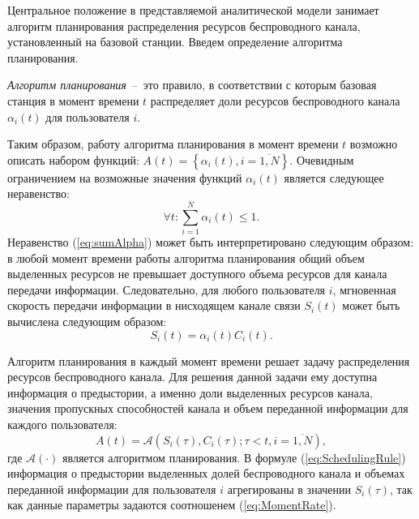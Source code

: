 Центральное положение в представляемой аналитической модели занимает алгоритм планирования распределения ресурсов беспроводного канала, установленный на базовой станции. Введем определение алгоритма планирования.

\begin{definition}
\label{def:SchedulingAlg}
    \emph{Алгоритм планирования}~--~это правило, в соответствии с которым базовая станция в момент времени $t$ распределяет доли ресурсов беспроводного канала $\alpha_i(t)$ для пользователя $i$.
\end{definition}

Таким образом, работу алгоритма планирования в момент времени $t$ возможно описать набором функций: ${A}(t) = \left\{\alpha_{i}(t), i = \overline{1,N}\right\}$. Очевидным ограничением на возможные значения функций $\alpha_i(t)$ является следующее неравенство:
\begin{equation}
\forall t: \sum\limits_{i=1}^{N}\alpha_{i}(t) \leq 1.
\label{eq:sumAlpha}
\end{equation}
Неравенство (\ref{eq:sumAlpha}) может быть интерпретировано следующим образом: в любой момент времени работы алгоритма планирования общий объем выделенных ресурсов не превышает доступного объема ресурсов для канала передачи информации. Следовательно, для любого пользователя $i$, мгновенная скорость передачи информации в нисходящем канале связи $S_i(t)$ может быть вычислена следующим образом:
\begin{equation}
S_i(t) = \alpha_i(t) C_i(t).
\label{eq:MomentRate}
\end{equation}

Алгоритм планирования в каждый момент времени решает задачу распределения ресурсов беспроводного канала. Для решения данной задачи ему доступна информация о предыстории, а именно доли выделенных ресурсов канала, значения пропускных способностей канала и объем переданной информации для каждого пользователя:
\begin{equation}
A(t) = \mathcal{A}\left( S_i(\tau), C_i(\tau);\tau<t, i=\overline{1,N} \right),
\label{eq:SchedulingRule}
\end{equation}
где $\mathcal{A}\left(\cdot\right)$ является алгоритмом планирования. В формуле (\ref{eq:SchedulingRule}) информация о предыстории выделенных долей беспроводного канала и объемах переданной информации для пользователя $i$ агрегированы в значении $S_i(\tau)$, так как данные параметры задаются соотношенем (\ref{eq:MomentRate}).

